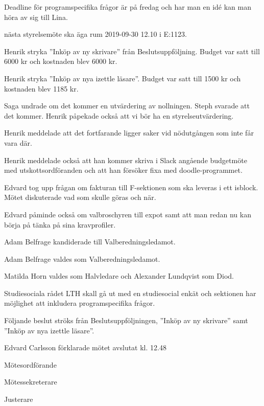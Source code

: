 \documentclass[10pt]{article}
\def\mo{Edvard Carlsson}
\def\ms{Mattias Lundström}
\def\ji{Lina Samnegård}
\begin{document}
\begin{paragrafer}
Deadline för programspecifika frågor är på fredag och har man en idé kan man höra av sig till Lina. 

\Mba nästa styrelsemöte ska äga rum 2019-09-30 12.10 i E:1123.


Henrik \ypa stryka ''Inköp av ny skrivare'' från Beslutsuppföljning. Budget var satt till 6000 kr och kostnaden blev 6000 kr. 

Henrik \ypa stryka ''Inköp av nya izettle läsare''. Budget var satt till 1500 kr och kostnaden blev 1185 kr. 

\Mbabay


Saga undrade om det kommer en utvärdering av nollningen. Steph svarade att det kommer. Henrik påpekade också att vi bör ha en styrelseutvärdering.

Henrik meddelade att det fortfarande ligger saker vid nödutgången som inte får vara där. 

Henrik meddelade också att han kommer skriva i Slack angående budgetmöte med utskottsordföranden och att han försöker fixa med doodle-programmet. 

Edvard tog upp frågan om fakturan till F-sektionen som ska leveras i ett isblock. Mötet diskuterade vad som skulle göras och när. 

Edvard påminde också om valbroschyren till expot samt att man redan nu kan börja på tänka på sina kravprofiler. 
 
Adam Belfrage kandiderade till Valberedningsledamot.

Adam Belfrage valdes som Valberedningsledamot. 

Matilda Horn valdes som Halvledare och Alexander Lundqvist som Diod. 

Studiesociala rådet LTH skall gå ut med en studiesocial enkät och sektionen har möjlighet att inkludera programspecifika frågor. 

Följande beslut ströks från Beslutsuppföljningen, ''Inköp av ny skrivare'' samt ''Inköp av nya izettle läsare''.

{\mo} förklarade mötet avslutat kl. 12.48
\end{paragrafer}

\hidesignfoot
\begin{signatures}{3}
\signature{\mo}{Mötesordförande}
\signature{\ms}{Mötessekreterare}
\signature{\ji}{Justerare}
\end{signatures}
\end{document}

